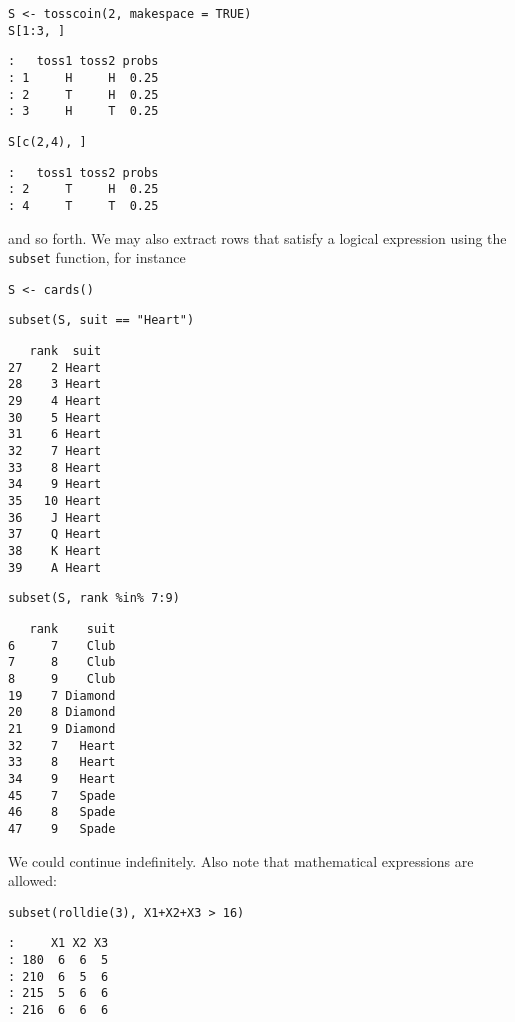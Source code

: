 \begin{verbatim}
S <- tosscoin(2, makespace = TRUE) 
S[1:3, ] 
\end{verbatim}

\begin{verbatim}
:   toss1 toss2 probs
: 1     H     H  0.25
: 2     T     H  0.25
: 3     H     T  0.25
\end{verbatim}

\begin{verbatim}
S[c(2,4), ] 
\end{verbatim}

\begin{verbatim}
:   toss1 toss2 probs
: 2     T     H  0.25
: 4     T     T  0.25
\end{verbatim}

and so forth. We may also extract rows that satisfy a logical
expression using the \texttt{subset} function, for instance

\begin{verbatim}
S <- cards() 
\end{verbatim}

\begin{verbatim}
subset(S, suit == "Heart") 
\end{verbatim}

\begin{verbatim}
   rank  suit
27    2 Heart
28    3 Heart
29    4 Heart
30    5 Heart
31    6 Heart
32    7 Heart
33    8 Heart
34    9 Heart
35   10 Heart
36    J Heart
37    Q Heart
38    K Heart
39    A Heart
\end{verbatim}

\begin{verbatim}
subset(S, rank %in% 7:9)
\end{verbatim}

\begin{verbatim}
   rank    suit
6     7    Club
7     8    Club
8     9    Club
19    7 Diamond
20    8 Diamond
21    9 Diamond
32    7   Heart
33    8   Heart
34    9   Heart
45    7   Spade
46    8   Spade
47    9   Spade
\end{verbatim}

We could continue indefinitely. Also note that mathematical
expressions are allowed:

\begin{verbatim}
subset(rolldie(3), X1+X2+X3 > 16) 
\end{verbatim}

\begin{verbatim}
:     X1 X2 X3
: 180  6  6  5
: 210  6  5  6
: 215  5  6  6
: 216  6  6  6
\end{verbatim}

